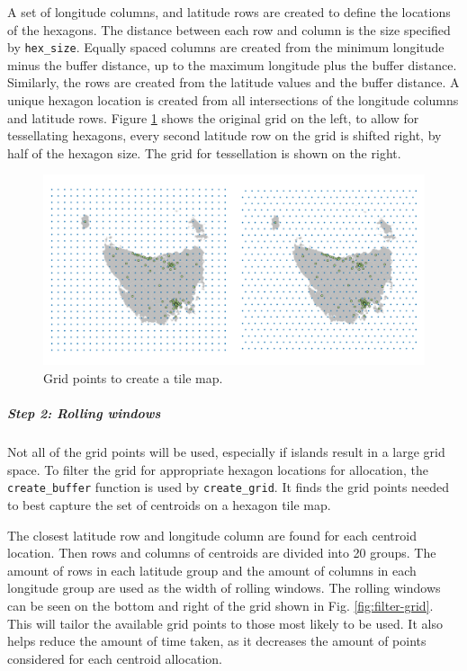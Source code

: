 \documentclass{monashthesis}
\begin{document}
A set of longitude columns, and latitude rows are created to define the locations of the hexagons. The distance between each row and column is the size specified by \texttt{hex\_size}.
Equally spaced columns are created from the minimum longitude minus the buffer distance, up to the maximum longitude plus the buffer distance. Similarly, the rows are created from the latitude values and the buffer distance.
A unique hexagon location is created from all intersections of the longitude columns and latitude rows.
Figure \ref{fig:grid2} shows the original grid on the left, to allow for tessellating hexagons, every second latitude row on the grid is shifted right, by half of the hexagon size. The grid for tessellation is shown on the right.

\begin{figure}[H]
\centering
\includegraphics[width=16cm]{figures/03-algorithm/2grid.png}
\caption{\label{fig:grid2}Grid points to create a tile map.}
\end{figure}

\hypertarget{step-2-rolling-windows}{%
\subparagraph{Step 2: Rolling windows}\label{step-2-rolling-windows}}

Not all of the grid points will be used, especially if islands result in a large grid space.
To filter the grid for appropriate hexagon locations for allocation, the \texttt{create\_buffer} function is used by \texttt{create\_grid}.
It finds the grid points needed to best capture the set of centroids on a hexagon tile map.

The closest latitude row and longitude column are found for each centroid location. Then rows and columns of centroids are divided into 20 groups.
The amount of rows in each latitude group and the amount of columns in each longitude group are used as the width of rolling windows. The rolling windows can be seen on the bottom and right of the grid shown in Fig. \ref{fig:filter-grid}.
This will tailor the available grid points to those most likely to be used.
It also helps reduce the amount of time taken, as it decreases the amount of points considered for each centroid allocation.
\end{document}
